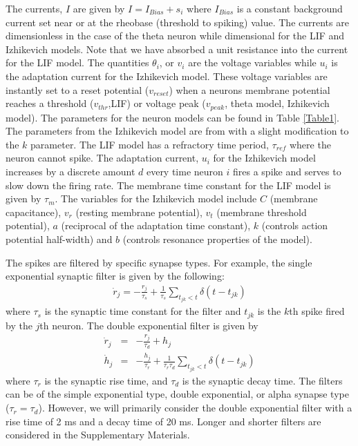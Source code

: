 \documentclass[11pt]{article} %
\begin{document}
The currents, $I$ are given by $I=I_{Bias}+ s_i$ where $I_{Bias}$ is a constant background current 
set near or at the rheobase (threshold to spiking) value.   
The currents are dimensionless in the case of the theta neuron while dimensional for the LIF and Izhikevich models.  
Note that we have absorbed a unit resistance into the current for the LIF model.   
The quantities $\theta_i$, or $v_i$ are the voltage variables while $u_i$ is the 
adaptation current for the Izhikevich model.  
These voltage variables are instantly set to a reset potential ($v_{reset}$) when a 
neurons membrane potential reaches a threshold ($v_{thr}$,LIF) or voltage peak 
($v_{peak}$, theta model, Izhikevich model).  The parameters for the neuron models 
can be found in Table \ref{Table1}.  The parameters from the Izhikevich model are from 
with a slight modification to the $k$ parameter.  The LIF model has a refractory time period, 
$\tau_{ref}$ where the neuron cannot spike.      
The adaptation current, $u_i$ for the Izhikevich model increases by a discrete amount 
$d$ every time neuron $i$ fires a spike and serves to slow down the firing rate.  
The membrane time constant for the LIF model is given by $\tau_m$.  
The variables for the Izhikevich model include $C$ (membrane capacitance), 
$v_r$ (resting membrane potential), $v_t$ (membrane threshold potential), 
$a$ (reciprocal of the adaptation time constant), 
$k$ (controls action potential half-width) and $b$ (controls resonance properties of the model).  

The spikes are filtered by specific synapse types.  
For example, the single exponential synaptic filter is given by the following:
\begin{eqnarray}
\dot{r}_j = -\frac{r_j}{\tau_s} + \frac{1}{\tau_s}\sum_{t_{jk}<t}\delta(t-t_{jk})  \label{fr11}
\end{eqnarray}
where $\tau_s$ is the synaptic time constant for the filter and $t_{jk}$ 
is the $k$th spike fired by the $j$th neuron.  
The double exponential filter is given by 
\begin{eqnarray}
\dot{r}_j &=& -\frac{r_j}{\tau_d} + h_j \\
\dot{h}_j&=& -\frac{h_j}{\tau_r} + \frac{1}{\tau_r\tau_d} \sum_{t_{jk}<t}\delta(t-t_{jk})  \label{fr12}
\end{eqnarray}
where $\tau_r$ is the synaptic rise time, and $\tau_d$ is the synaptic decay time.    
The filters can be of the simple exponential type, double exponential, 
or alpha synapse type ($\tau_r = \tau_d$).   
However, we will primarily consider the double exponential filter with a rise time of 
2 ms and a decay time of 20 ms.  
Longer and shorter filters are considered in the Supplementary Materials.   
\end{document}
